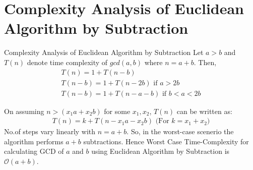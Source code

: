 \documentclass[8pt]{beamer}
\begin{document}
\section{Complexity Analysis of Euclidean Algorithm by Subtraction}
\begin{frame}{Complexity Analysis of Euclidean Algorithm by Subtraction}
Let $a > b$ and $T(n)$ denote time complexity of $gcd(a,b)$ where $n = a+b$. Then,
\begin{align}
T(n) = 1 + T(n-b)\\
T(n-b) = 1 + T(n-2b) \text{ if $a > 2b$}\\
T(n-b) = 1 + T(n-a-b) \text{ if $b < a < 2b$}
\end{align}

On assuming $n > (x_{1}a + x_{2}b)$ for some $x_{1}, x_{2}$, $T(n)$ can be written as:
\begin{align}
T(n) = k + T(n - x_{1}a - x_{2}b) \text{ (For $k = x_{1} + x_{2}$)}
\end{align}
No.of steps vary linearly with $n=a+b$. So, in the worst-case scenerio the algorithm performs $a+b$ subtractions. Hence Worst Case Time-Complexity for calculating GCD of $a$ and  $b$ using Euclidean Algorithm by Subtraction is $\mathcal{O}(a + b)$.\\
\end{frame}
\end{document}
